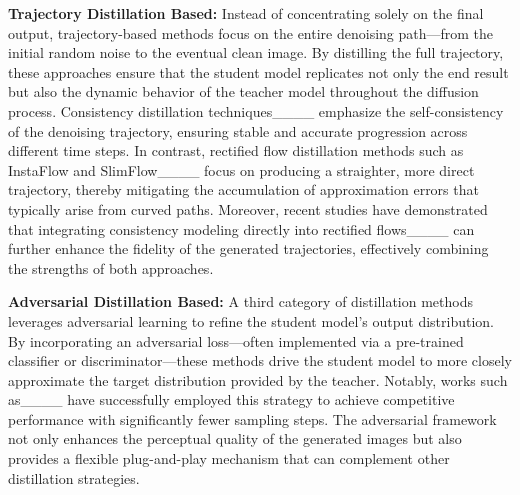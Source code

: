 \textbf{Trajectory Distillation Based:} Instead of concentrating solely on the final output, trajectory-based methods focus on the entire denoising path—from the initial random noise to the eventual clean image. By distilling the full trajectory, these approaches ensure that the student model replicates not only the end result but also the dynamic behavior of the teacher model throughout the diffusion process. Consistency distillation techniques____ emphasize the self-consistency of the denoising trajectory, ensuring stable and accurate progression across different time steps. In contrast, rectified flow distillation methods such as InstaFlow and SlimFlow____ focus on producing a straighter, more direct trajectory, thereby mitigating the accumulation of approximation errors that typically arise from curved paths. Moreover, recent studies have demonstrated that integrating consistency modeling directly into rectified flows____ can further enhance the fidelity of the generated trajectories, effectively combining the strengths of both approaches.

\textbf{Adversarial Distillation Based:} A third category of distillation methods leverages adversarial learning to refine the student model's output distribution. By incorporating an adversarial loss—often implemented via a pre-trained classifier or discriminator—these methods drive the student model to more closely approximate the target distribution provided by the teacher. Notably, works such as____ have successfully employed this strategy to achieve competitive performance with significantly fewer sampling steps. The adversarial framework not only enhances the perceptual quality of the generated images but also provides a flexible plug-and-play mechanism that can complement other distillation strategies.
